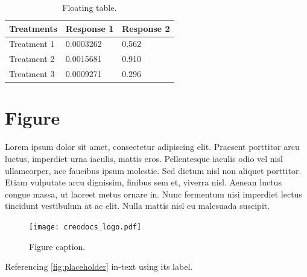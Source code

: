 \documentclass[
	11pt, %
	fleqn, %
	a4paper, %
]{LegrandOrangeBook}
\begin{document}
\begin{table}[t] %
	\centering %
	\begin{tabular}{L{0.15\textwidth} R{0.15\textwidth} R{0.15\textwidth}} %
		\toprule
		\textbf{Treatments} & \textbf{Response 1} & \textbf{Response 2} \\
		\midrule
		Treatment 1         & 0.0003262           & 0.562               \\
		Treatment 2         & 0.0015681           & 0.910               \\
		Treatment 3         & 0.0009271           & 0.296               \\
		\bottomrule
	\end{tabular}
	\caption{Floating table.}
	\label{tab:floating} %
\end{table}


\section{Figure}

Lorem ipsum dolor sit amet, consectetur adipiscing elit. Praesent porttitor arcu luctus, imperdiet urna iaculis, mattis eros. Pellentesque iaculis odio vel nisl ullamcorper, nec faucibus ipsum molestie. Sed dictum nisl non aliquet porttitor. Etiam vulputate arcu dignissim, finibus sem et, viverra nisl. Aenean luctus congue massa, ut laoreet metus ornare in. Nunc fermentum nisi imperdiet lectus tincidunt vestibulum at ac elit. Nulla mattis nisl eu malesuada suscipit.

\begin{figure}[H] %
	\centering %
	\texttt{[image: creodocs\_logo.pdf]} %
	\caption{Figure caption.}
	\label{fig:placeholder} %
\end{figure}

Referencing \autoref{fig:placeholder} in-text using its label.
\end{document}
